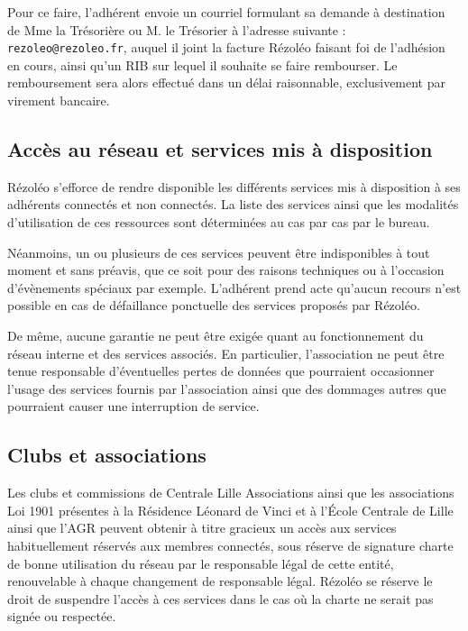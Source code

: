 \documentclass[12pt, a4paper]{article}
\begin{document}
	\bigskip

	Pour ce faire, l'adhérent envoie un courriel formulant sa demande à destination
	de Mme la Trésorière ou M. le Trésorier à l'adresse suivante : \nolinkurl{rezoleo@rezoleo.fr},
	auquel il joint la facture Rézoléo faisant foi de l'adhésion en cours, ainsi qu'un
	RIB sur lequel il souhaite se faire rembourser. Le remboursement sera alors effectué
    dans un délai raisonnable, exclusivement par virement bancaire.

	\subsection{Accès au réseau et services mis à disposition}

	Rézoléo s'efforce de rendre disponible les différents services mis à
	disposition à ses adhérents connectés et non connectés. La liste des services ainsi
	que les modalités d'utilisation de ces ressources sont déterminées au cas par cas
	par le bureau.

	\bigskip

	Néanmoins, un ou plusieurs de ces services peuvent être indisponibles à tout moment
	et sans préavis, que ce soit pour des raisons techniques ou à l'occasion d'évènements
	spéciaux par exemple. L'adhérent prend acte qu'aucun recours n'est possible en
	cas de défaillance ponctuelle des services proposés par Rézoléo.

	\bigskip

	De même, aucune garantie ne peut être exigée quant au fonctionnement du réseau
	interne et des services associés. En particulier, l'association ne peut être tenue
	responsable d'éventuelles pertes de données que pourraient occasionner l'usage
	des services fournis par l'association ainsi que des dommages autres que pourraient
	causer une interruption de service.

	\subsection{Clubs et associations}

	Les clubs et commissions de Centrale Lille Associations ainsi que les
	associations Loi 1901 présentes à la Résidence Léonard de Vinci et à l'École
	Centrale de Lille ainsi que l'AGR peuvent
	obtenir à titre gracieux un accès aux services habituellement réservés aux
	membres connectés, sous réserve de signature charte de bonne utilisation du réseau
	par le responsable légal de cette entité, renouvelable à chaque changement de
	responsable légal. Rézoléo se réserve le droit de suspendre l'accès à ces services
	dans le cas où la charte ne serait pas signée ou respectée.
\end{document}
